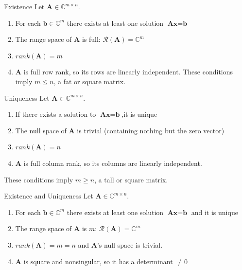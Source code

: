 \begin{theorembox}{Existence}
Let $\textbf{A} \in \mathbb{C}^{m\times n}$.
\begin{enumerate}
    \item For each $\textbf{b} \in \mathbb{C}^m$ there exists at least one solution $\textbf{Ax}=\textbf{b}$
    \item The range space of \textbf{A} is full: $\mathcal{R}(\textbf{A}) = \mathbb{C}^m$
    \item $rank(\textbf{A}) = m$
    \item \textbf{A} is full row rank, so its rows are linearly independent.
These conditions imply $m\leq n$, a fat or square matrix.
\end{enumerate}
\end{theorembox}
\begin{theorembox}{Uniqueness}
Let $\textbf{A} \in \mathbb{C}^{m\times n}$.
\begin{enumerate}
    \item If there exists a solution to $\textbf{Ax}=\textbf{b}$,it is unique
    \item The null space of \textbf{A} is trivial (containing nothing but the zero vector)
    \item $rank(\textbf{A}) = n$
    \item \textbf{A} is full column rank, so its columns are linearly independent.
\end{enumerate}
These conditions imply $m\geq n$, a tall or square matrix.
\end{theorembox}

\begin{theorembox}{Existence and Uniqueness}
Let $\textbf{A} \in \mathbb{C}^{m\times n}$.
\begin{enumerate}
    \item For each $\textbf{b} \in \mathbb{C}^m$ there exists at least one solution $\textbf{Ax}=\textbf{b}$ and it is unique
    \item The range space of \textbf{A} is $m$: $\mathcal{R}(\textbf{A}) = \mathbb{C}^m$
    \item $rank(\textbf{A}) = m = n$ and \textbf{A}'s null space is trivial.
    \item \textbf{A} is square and nonsingular, so it has a determinant $\neq 0$
\end{enumerate}
\end{theorembox}

